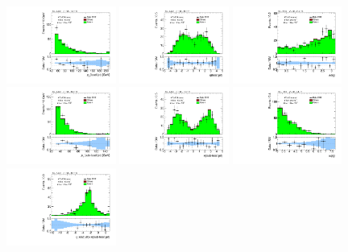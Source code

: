 \clearpage
\begin{figure}[tp]
  \includegraphics[width=0.32\textwidth]{figures/analysis/vbf-ZllCR/jet-1-pt}
  \includegraphics[width=0.32\textwidth]{figures/analysis/vbf-ZllCR/jet-1-eta}
  \includegraphics[width=0.32\textwidth]{figures/analysis/vbf-ZllCR/jets-dphi}
  \includegraphics[width=0.32\textwidth]{figures/analysis/vbf-ZllCR/jet-2-pt}
  \includegraphics[width=0.32\textwidth]{figures/analysis/vbf-ZllCR/jet-2-eta}
  \includegraphics[width=0.32\textwidth]{figures/analysis/vbf-ZllCR/jets-deta}
  \includegraphics[width=0.32\textwidth]{figures/analysis/vbf-ZllCR/jets-etaprod}

\end{figure}
